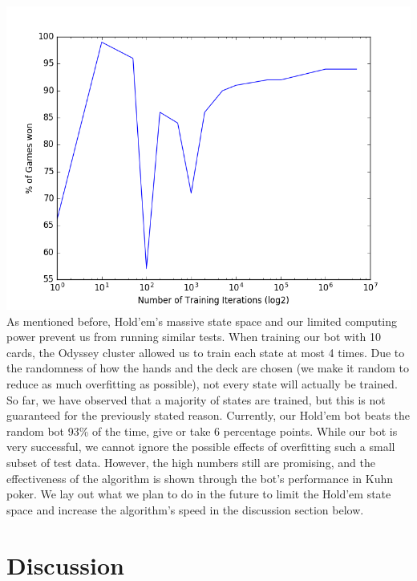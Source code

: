 \documentclass[11pt]{article}
\begin{document}
\includegraphics[scale=0.75]{KuhnResults} \\

As mentioned before, Hold'em's massive state space and our limited computing power prevent us from running similar tests. When training our bot with 10 cards, the Odyssey cluster allowed us to train each state at most 4 times. Due to the randomness of how the hands and the deck are chosen (we make it random to reduce as much overfitting as possible), not every state will actually be trained. So far, we have observed that a majority of states are trained, but this is not guaranteed for the previously stated reason. Currently, our Hold'em bot beats the random bot 93\% of the time, give or take 6 percentage points. While our bot is very successful, we cannot ignore the possible effects of overfitting such a small subset of test data. However, the high numbers still are promising, and the effectiveness of the algorithm is shown through the bot's performance in Kuhn poker. We lay out what we plan to do in the future to limit the Hold'em state space and increase the algorithm's speed in the discussion section below.

\section{Discussion}
\end{document}
